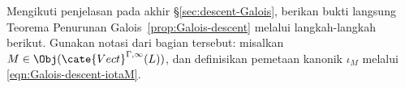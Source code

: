 
\hypertarget{o014.aljabr2.chapter7.exercises-c}{ }
	\item Mengikuti penjelasan pada akhir \S\ref{sec:descent-Galois}, berikan
	bukti langsung Teorema Penurunan Galois~\ref{prop:Galois-descent} melalui
	langkah-langkah berikut. Gunakan notasi dari bagian tersebut: misalkan
	$M\in\Obj(\cate{Vect}^{\Gamma,\infty}(L))$, dan definisikan pemetaan
	kanonik $\iota_M$ melalui \eqref{eqn:Galois-descent-iotaM}.
